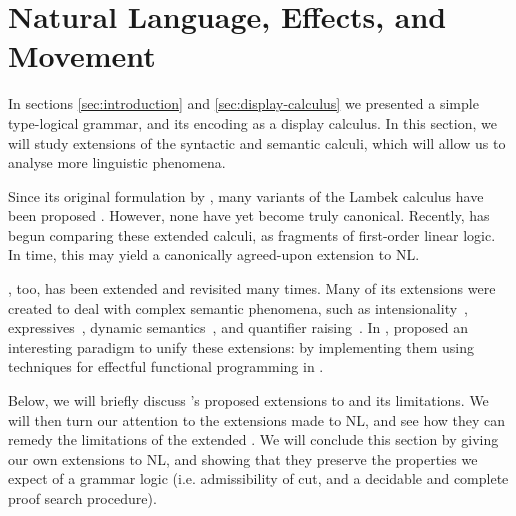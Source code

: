 \section{Natural Language, Effects, and Movement}

In sections \autoref{sec:introduction} and
\autoref{sec:display-calculus} we presented a simple type-logical
grammar, and its encoding as a display calculus. In this section, we
will study extensions of the syntactic and semantic calculi, which
will allow us to analyse more linguistic phenomena.

Since its original formulation by \citet{lambek1961}, many variants of
the Lambek calculus have been proposed
\citep{steedman1988,moortgat2012,morrill2011,kubota2012,barker2015}.
However, none have yet become truly canonical.
Recently, \citet{moot2015} has begun comparing these extended calculi,
as fragments of first-order linear logic. In time, this may yield a
canonically agreed-upon extension to NL.

\lamET, too, has been extended and revisited many times. Many of its
extensions were created to deal with complex semantic phenomena, such
as intensionality~\citep{winter2009},
expressives~\citep{potts2003,mccready2010,gutzmann2011}, dynamic
semantics~\citep{groenendijk1995}, and quantifier
raising~\citep{barker2015}. 
In \citeyear{shan2002}, \citeauthor{shan2002} proposed an interesting
paradigm to unify these extensions: by implementing them using
techniques for effectful functional programming in \lamET.

Below, we will briefly discuss \citeauthor{shan2002}'s proposed
extensions to \lamET and its limitations. We will then turn our
attention to the extensions made to NL, and see how they can remedy
the limitations of the extended \lamET. We will conclude this section
by giving our own extensions to NL, and showing that they preserve the
properties we expect of a grammar logic (i.e. admissibility of cut,
and a decidable and complete proof search procedure).


